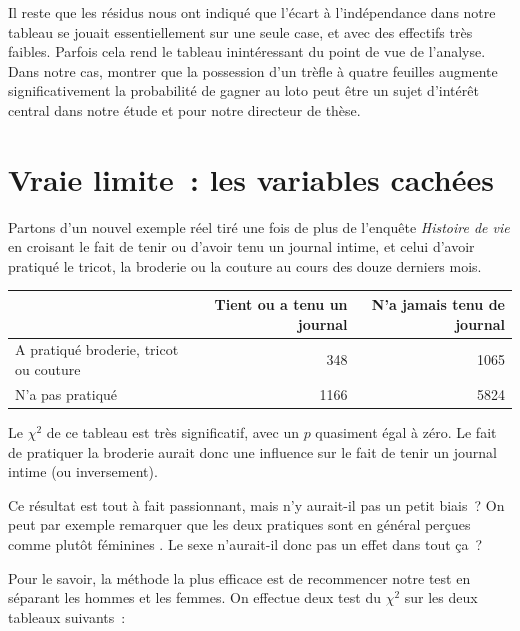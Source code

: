\documentclass[a4paper,10pt,twoside,francais]{report}
\newcommand{\chid}{$\chi^2$\xspace}
\begin{document}
Il reste que les résidus nous ont indiqué que l'écart à l'indépendance
dans notre tableau se jouait essentiellement sur une seule case, et
avec des effectifs très faibles. Parfois cela rend le tableau
inintéressant du point de vue de l'analyse. Dans notre cas, montrer
que la possession d'un trèfle à quatre feuilles augmente
significativement la probabilité de gagner au loto peut être un sujet
d'intérêt central dans notre étude et pour notre directeur de thèse.


\section{Vraie limite~: les variables cachées}
\label{ssec-varcachee}


Partons d'un nouvel exemple réel tiré une fois de plus de l'enquête
\textit{Histoire de vie} en croisant le fait de tenir ou d'avoir tenu
un journal intime, et celui d'avoir pratiqué le tricot, la broderie ou
la couture au cours des douze derniers mois.

\begin{table}[H]
  \begin{center}
    \begin{tabular}[!h]{lrr}
      \toprule
      & Tient ou a tenu un journal & N'a jamais tenu de journal \\
      \midrule
      A pratiqué broderie, tricot ou couture & 348 & 1065 \\
      N'a pas pratiqué & 1166 & 5824 \\
      \bottomrule
    \end{tabular}
  \end{center}
\end{table}
 
Le \chid de ce tableau est très significatif, avec un $p$ quasiment
égal à zéro. Le fait de pratiquer la broderie aurait donc une
influence sur le fait de tenir un journal intime (ou inversement).

Ce résultat est tout à fait passionnant, mais n'y aurait-il pas un
petit biais~? On peut par exemple remarquer que les deux pratiques
sont en général perçues comme plutôt \og féminines \fg{}. Le sexe
n'aurait-il donc pas un effet dans tout ça~?

Pour le savoir, la méthode la plus efficace est de recommencer notre
test en séparant les hommes et les femmes. On effectue deux test du
\chid sur les deux tableaux suivants~:
\end{document}
